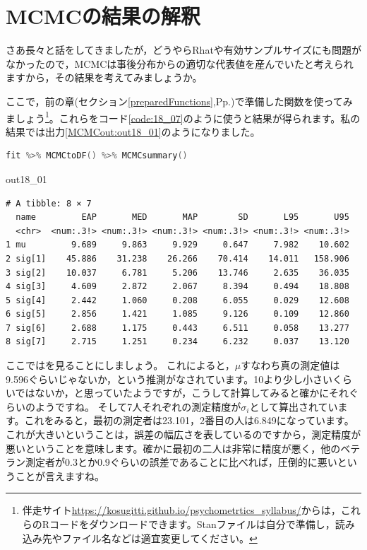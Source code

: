 \documentclass{ltjsbook}
\begin{document}
\section{MCMCの結果の解釈}
さあ長々と話をしてきましたが，どうやらRhatや有効サンプルサイズにも問題がなかったので，MCMCは事後分布からの適切な代表値を産んでいたと考えられますから，その結果を考えてみましょうか。

ここで，前の章(セクション\ref{preparedFunctions},Pp.\pageref{preparedFunctions})で準備した関数を使ってみましょう\footnote{伴走サイト\url{https://kosugitti.github.io/psychometrtics_syllabus/}からは，これらのRコードをダウンロードできます。Stanファイルは自分で準備し，読み込み先やファイル名などは適宜変更してください。}。これらをコード\ref{code:18_07}のように使うと結果が得られます。私の結果では出力\ref{MCMCout:out18_01}のようになりました。

\begin{lstlisting}[language=C++,label={code:18_07},caption={stanの結果を準備し関数に与える}]
fit %>% MCMCtoDF() %>% MCMCsummary()
\end{lstlisting}

\begin{MCMCout}{}{out18_01}
	\begin{verbatim}
# A tibble: 8 × 7
  name         EAP       MED       MAP        SD       L95       U95
  <chr>  <num:.3!> <num:.3!> <num:.3!> <num:.3!> <num:.3!> <num:.3!>
1 mu         9.689     9.863     9.929     0.647     7.982    10.602
2 sig[1]    45.886    31.238    26.266    70.414    14.011   158.906
3 sig[2]    10.037     6.781     5.206    13.746     2.635    36.035
4 sig[3]     4.609     2.872     2.067     8.394     0.494    18.808
5 sig[4]     2.442     1.060     0.208     6.055     0.029    12.608
6 sig[5]     2.856     1.421     1.085     9.126     0.109    12.860
7 sig[6]     2.688     1.175     0.443     6.511     0.058    13.277
8 sig[7]     2.715     1.251     0.234     6.232     0.037    13.120
\end{verbatim}
\end{MCMCout}

ここではを見ることにしましょう。
これによると，$\mu$すなわち真の測定値は9.596ぐらいじゃないか，という推測がなされています。10より少し小さいくらいではないか，と思っていたようですが，こうして計算してみると確かにそれぐらいのようですね。
そして7人それぞれの測定精度が$\sigma_i$として算出されています。これをみると，最初の測定者は23.101，2番目の人は6.849になっています。これが大きいということは，誤差の幅広さを表しているのですから，測定精度が悪いということを意味します。確かに最初の二人は非常に精度が悪く，他のベテラン測定者が0.3とか0.9ぐらいの誤差であることに比べれば，圧倒的に悪いということが言えますね。
\end{document}
